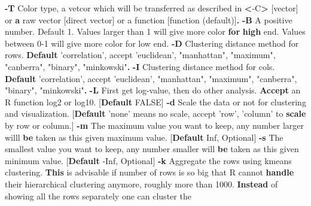 \documentclass[]{article}
\newenvironment{Shaded}{\begin{snugshade}}{\end{snugshade}}
\newcommand{\KeywordTok}[1]{\textcolor[rgb]{0.13,0.29,0.53}{\textbf{{#1}}}}
\newcommand{\StringTok}[1]{\textcolor[rgb]{0.31,0.60,0.02}{{#1}}}
\newcommand{\NormalTok}[1]{{#1}}
\numberwithin{figure}{section}
\numberwithin{table}{section}
\theoremstyle{definition}
\theoremstyle{definition}
\theoremstyle{definition}
\theoremstyle{remark}
\begin{document}
\begin{Shaded}
\begin{Highlighting}[]
    \KeywordTok{-T}  \NormalTok{Color type, a vetcor which will be transferred as described in }\KeywordTok{<}\NormalTok{-C}\KeywordTok{>} \NormalTok{[vector] or}
        \KeywordTok{a} \NormalTok{raw vector [direct vector] or a function [function (default)]}\KeywordTok{.}
    \KeywordTok{-B}  \NormalTok{A positive number. Default 1. Values larger than 1 will give more color}
        \KeywordTok{for} \KeywordTok{high} \NormalTok{end. Values between 0-1 will give more color for low end.  }
    \KeywordTok{-D}  \NormalTok{Clustering distance method for rows.}
        \KeywordTok{Default} \StringTok{'correlation'}\NormalTok{, accept }\StringTok{'euclidean'}\NormalTok{, }
        \StringTok{"manhattan"}\NormalTok{, }\StringTok{"maximum"}\NormalTok{, }\StringTok{"canberra"}\NormalTok{, }\StringTok{"binary"}\NormalTok{, }\StringTok{"minkowski"}\KeywordTok{.} 
    \KeywordTok{-I}  \NormalTok{Clustering distance method for cols.}
        \KeywordTok{Default} \StringTok{'correlation'}\NormalTok{, accept }\StringTok{'euclidean'}\NormalTok{, }
        \StringTok{"manhattan"}\NormalTok{, }\StringTok{"maximum"}\NormalTok{, }\StringTok{"canberra"}\NormalTok{, }\StringTok{"binary"}\NormalTok{, }\StringTok{"minkowski"}\KeywordTok{.} 
    \KeywordTok{-L}  \NormalTok{First get log-value, then do other analysis.}
        \KeywordTok{Accept} \NormalTok{an R function log2 or log10. }
        \NormalTok{[}\KeywordTok{Default} \NormalTok{FALSE]}
    \KeywordTok{-d}  \NormalTok{Scale the data or not for clustering and visualization.}
        \NormalTok{[}\KeywordTok{Default} \StringTok{'none'} \NormalTok{means no scale, accept }\StringTok{'row'}\NormalTok{, }\StringTok{'column'} \NormalTok{to }
        \KeywordTok{scale} \NormalTok{by row or column.]}
    \KeywordTok{-m}  \NormalTok{The maximum value you want to keep, any number larger willl}
        \KeywordTok{be} \NormalTok{taken as this given maximum value.}
        \NormalTok{[}\KeywordTok{Default} \NormalTok{Inf, Optional] }
    \KeywordTok{-s}  \NormalTok{The smallest value you want to keep, any number smaller will}
        \KeywordTok{be} \NormalTok{taken as this given minimum value.}
        \NormalTok{[}\KeywordTok{Default} \NormalTok{-Inf, Optional]  }
    \KeywordTok{-k}  \NormalTok{Aggregate the rows using kmeans clustering. }
        \KeywordTok{This} \NormalTok{is advisable if number of rows is so big that R cannot }
        \KeywordTok{handle} \NormalTok{their hierarchical clustering anymore, roughly more than 1000.}
        \KeywordTok{Instead} \NormalTok{of showing all the rows separately one can cluster the}

\end{Highlighting}
\end{Shaded}
\end{document}
